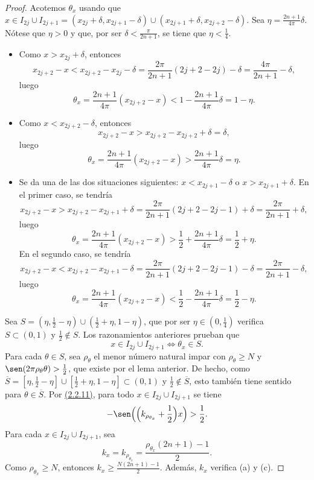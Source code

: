\documentclass[a4paper, 12pt, oneside]{book}
\begin{document}
\begin{proof}
    Acotemos $\theta_x$ usando que $x \in I_{2j}\cup I_{2j+1}= (x_{2j}+\delta,x_{2j+1}-\delta) \cup (x_{2j+1}+\delta,x_{2j+2}-\delta)$. Sea $\eta = \frac{2n+1}{4\pi}\delta$. Nótese que $\eta > 0$ y que, por ser $\delta < \frac{\pi}{2n+1}$, se tiene que $\eta < \frac{1}{4}$.
    \begin{itemize}
        \item Como $x > x_{2j}+\delta$, entonces
        \[x_{2j+2}-x < x_{2j+2}-x_{2j}-\delta = \frac{2\pi}{2n+1}(2j+2-2j)-\delta = \frac{4\pi}{2n+1}-\delta,\]
        luego 
        \[\theta_x = \frac{2n+1}{4\pi}(x_{2j+2}-x) < 1-\frac{2n+1}{4\pi}\delta = 1-\eta.\]
        \item Como $x < x_{2j+2}-\delta$, entonces
        \[x_{2j+2}-x > x_{2j+2}-x_{2j+2}+\delta = \delta,\]
        luego
        \[\theta_x = \frac{2n+1}{4\pi}(x_{2j+2}-x) > \frac{2n+1}{4\pi}\delta = \eta.\]
        \item Se da una de las dos situaciones siguientes: $x < x_{2j+1}-\delta$ o $x > x_{2j+1}+\delta$. En el primer caso, se tendría
        \[x_{2j+2}-x > x_{2j+2}-x_{2j+1}+\delta = \frac{2\pi}{2n+1}(2j+2-2j-1)+\delta = \frac{2\pi}{2n+1}+\delta,\]
        luego
        \[\theta_x = \frac{2n+1}{4\pi}(x_{2j+2}-x) > \frac{1}{2}+\frac{2n+1}{4\pi}\delta = \frac{1}{2}+\eta.\]
        En el segundo caso, se tendría
        \[x_{2j+2}-x < x_{2j+2}-x_{2j+1}-\delta = \frac{2\pi}{2n+1}(2j+2-2j-1)-\delta = \frac{2\pi}{2n+1}- \delta,\]
        luego
        \[\theta_x = \frac{2n+1}{4\pi}(x_{2j+2}-x) < \frac{1}{2}-\frac{2n+1}{4\pi}\delta = \frac{1}{2}-\eta.\]
    \end{itemize}

    Sea $S = (\eta,\frac{1}{2}-\eta) \cup (\frac{1}{2}+\eta,1-\eta)$, que por ser $\eta \in (0,\frac{1}{4})$ verifica $S \subset (0,1)$ y $\frac{1}{2}\not\in S$. Los razonamientos anteriores prueban que
    \[x \in I_{2j} \cup I_{2j+1} \iff \theta_x \in S.\]
    Para cada $\theta \in S$, sea $\rho_\theta$ el menor número natural impar con $\rho_\theta \geq N$ y $\sen(2\pi\rho_\theta\theta) > \frac{1}{2}$, que existe por el lema anterior. De hecho, como $\overline{S} = [\eta,\frac{1}{2}-\eta] \cup [\frac{1}{2}+\eta,1-\eta] \subset (0,1)$ y $\frac{1}{2}\not\in\overline{S}$, esto también tiene sentido para $\theta \in \overline{S}$. Por \hyperref[2.2.11]{\color{blue}(2.2.11)}, para todo $x \in I_{2j} \cup I_{2j+1}$ se tiene
    \[-\sen\Bigl(\Bigl(k_{\rho_{\theta_x}}+\frac{1}{2}\Bigr)x\Bigr) > \frac{1}{2}.\]
    Para cada $x \in I_{2j} \cup I_{2j+1}$, sea
    \[k_x = k_{\rho_{\theta_x}} = \frac{\rho_{\theta_x}(2n+1)-1}{2}.\] Como $\rho_{\theta_x} \geq N$, entonces $k_x \geq \frac{N(2n+1)-1}{2}$. Además, $k_x$ verifica (a) y (c). 


\end{proof}
\end{document}
